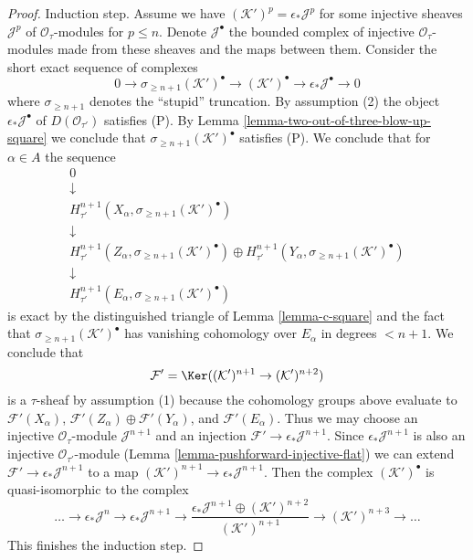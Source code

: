 \begin{proof}
\medskip\noindent
Induction step. Assume we have $(\mathcal{K}')^p = \epsilon_*\mathcal{J}^p$
for some injective sheaves $\mathcal{J}^p$ of $\mathcal{O}_\tau$-modules
for $p \leq n$. Denote $\mathcal{J}^\bullet$ the bounded complex
of injective $\mathcal{O}_\tau$-modules made from these sheaves
and the maps between them. Consider the short exact sequence of complexes
$$
0 \to \sigma_{\geq n + 1}(\mathcal{K}')^\bullet \to
(\mathcal{K}')^\bullet \to \epsilon_*\mathcal{J}^\bullet \to 0
$$
where $\sigma_{\geq n + 1}$ denotes the ``stupid'' truncation.
By assumption (2) the object $\epsilon_*\mathcal{J}^\bullet$
of $D(\mathcal{O}_{\tau'})$ satisfies (P).
By Lemma \ref{lemma-two-out-of-three-blow-up-square}
we conclude that $\sigma_{\geq n + 1}(\mathcal{K}')^\bullet$
satisfies (P).
We conclude that for $\alpha \in A$
the sequence
$$
\begin{matrix}
0 \\
\downarrow \\
H^{n + 1}_{\tau'}(X_\alpha, \sigma_{\geq n + 1}(\mathcal{K}')^\bullet) \\
\downarrow \\
H^{n + 1}_{\tau'}(Z_\alpha, \sigma_{\geq n + 1}(\mathcal{K}')^\bullet) \oplus
H^{n + 1}_{\tau'}(Y_\alpha, \sigma_{\geq n + 1}(\mathcal{K}')^\bullet) \\
\downarrow \\
H^{n + 1}_{\tau'}(E_\alpha, \sigma_{\geq n + 1}(\mathcal{K}')^\bullet)
\end{matrix}
$$
is exact by the distinguished triangle of Lemma \ref{lemma-c-square}
and the fact that $\sigma_{\geq n + 1}(\mathcal{K}')^\bullet$
has vanishing cohomology over $E_\alpha$ in degrees $< n + 1$.
We conclude that
$$
\mathcal{F}' = \Ker((\mathcal{K}')^{n + 1} \to (\mathcal{K}')^{n + 2})
$$
is a $\tau$-sheaf by assumption (1) because the cohomology groups
above evaluate to
$\mathcal{F}'(X_\alpha)$,
$\mathcal{F}'(Z_\alpha) \oplus \mathcal{F}'(Y_\alpha)$, and
$\mathcal{F}'(E_\alpha)$.
Thus we may choose an injective $\mathcal{O}_\tau$-module
$\mathcal{J}^{n + 1}$ and an injection
$\mathcal{F}' \to \epsilon_*\mathcal{J}^{n + 1}$.
Since $\epsilon_*\mathcal{J}^{n + 1}$ is also an injective
$\mathcal{O}_{\tau'}$-module (Lemma \ref{lemma-pushforward-injective-flat})
we can extend $\mathcal{F}' \to \epsilon_*\mathcal{J}^{n + 1}$
to a map
$(\mathcal{K}')^{n + 1} \to \epsilon_*\mathcal{J}^{n + 1}$.
Then the complex $(\mathcal{K}')^\bullet$ is quasi-isomorphic to the complex
$$
\ldots \to
\epsilon_*\mathcal{J}^n \to
\epsilon_*\mathcal{J}^{n + 1} \to
\frac{\epsilon_*\mathcal{J}^{n + 1} \oplus (\mathcal{K}')^{n + 2}}{(\mathcal{K}')^{n + 1}}
\to
(\mathcal{K}')^{n + 3} \to \ldots
$$
This finishes the induction step.


\end{proof}
